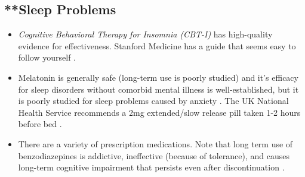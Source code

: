 \documentclass[12pt,letterpaper]{book}
\begin{document}
\subsection*{**Sleep Problems}
\begin{itemize}
    \item \textit{Cognitive Behavioral Therapy for Insomnia (CBT-I)} has high-quality evidence for effectiveness. Stanford Medicine has a guide that seems easy to follow yourself \cite{stanfordSleep}.
    \item Melatonin is generally safe (long-term use is poorly studied) and it's efficacy for sleep disorders without comorbid mental illness is well-established, but it is poorly studied for sleep problems caused by anxiety \cite{moon2022role}. The UK National Health Service recommends a 2mg extended/slow release pill taken 1-2 hours before bed \cite{nhsMelatonin}.
    \item There are a variety of prescription medications. Note that long term use of benzodiazepines is addictive, ineffective (because of tolerance), and causes long-term cognitive impairment that persists even after discontinuation \cite{barkerBenzo}.
\end{itemize}
\end{document}
